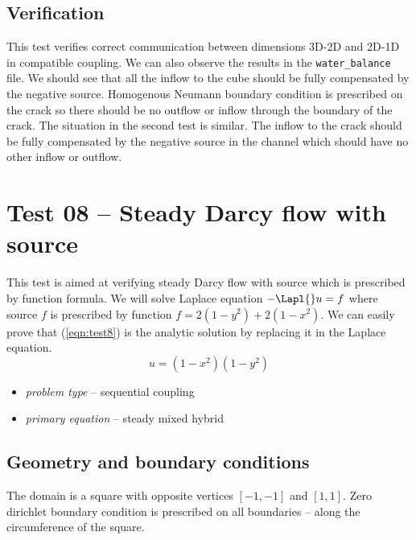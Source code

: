 
\subsection*{Verification}
This test verifies correct communication between dimensions 3D-2D and 2D-1D in compatible coupling.
We can also observe the results in the \verb'water_balance' file. We should see that all the inflow 
to the cube should be fully compensated by the negative source. Homogenous Neumann boundary condition 
is prescribed on the crack so there should be no outflow or inflow through the boundary of the crack.
The situation in the second test is similar. The inflow to the crack should be fully compensated by 
the negative source in the channel which should have no other inflow or outflow.



\section{Test 08 -- Steady Darcy flow with source}
\label{sec:test08}
This test is aimed at verifying steady Darcy flow with source which is prescribed by function formula. 
We will solve Laplace equation $-\Lapl{}u = f$ where source $f$ is prescribed by function $f = 2(1-y^2) + 2(1-x^2)$.
We can easily prove that (\ref{eqn:test8}) is the analytic solution by replacing it in the Laplace equation.
\begin{equation}
u = (1-x^2)(1-y^2) \label{eqn:test8}
\end{equation}

  \begin{itemize} 
    \item \emph{problem type} -- sequential coupling 
    \item \emph{primary equation} -- steady mixed hybrid
  \end{itemize}

\subsection*{Geometry and boundary conditions}
The domain is a square with opposite vertices $[-1,-1]$ and $[1,1]$. Zero dirichlet boundary condition is prescribed 
on all boundaries -- along the circumference of the square.
 
